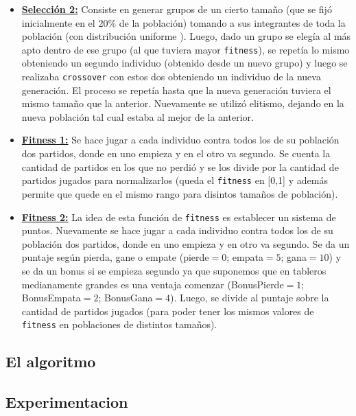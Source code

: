 \documentclass[A4paper,oneside,fleqn,11pt]{article}
\theoremstyle{definition}
\begin{document}
\begin{itemize}
\item \textbf{\underline{Selección 2:}} Consiste en generar grupos de un cierto tamaño (que se fijó inicialmente en el 20\% de la población) tomando a sus integrantes de toda la población (con distribución uniforme%
). Luego, dado un grupo se elegía al más apto dentro de ese grupo (al que tuviera mayor \texttt{fitness}), se repetía lo mismo obteniendo un segundo individuo (obtenido desde un nuevo grupo) y luego se realizaba \texttt{crossover} con estos dos obteniendo un individuo de la nueva generación. El proceso se repetía hasta que la nueva generación tuviera el mismo tamaño que la anterior. Nuevamente se utilizó elitismo, dejando en la nueva población tal cual estaba al mejor de la anterior.

\item \textbf{\underline{Fitness 1:}} Se hace jugar a cada individuo contra todos los de su población dos partidos, donde en uno empieza y en el otro va segundo. Se cuenta la cantidad de partidos en los que no perdió y se los divide por la cantidad de partidos jugados para normalizarlos (queda el \texttt{fitness} en [0,1] y además permite que quede en el mismo rango para disintos tamaños de población).


\item \textbf{\underline{Fitness 2:}} La idea de esta función de \texttt{fitness} es establecer un sistema de puntos. Nuevamente se hace jugar a cada individuo contra todos los de su población dos partidos, donde en uno empieza y en otro va segundo. Se da un puntaje según pierda, gane o empate (pierde$=0$; empata$=5$; gana$=10$) y se da un bonus si se empieza segundo ya que suponemos que en tableros medianamente grandes es una ventaja comenzar (BonusPierde$=1$; BonusEmpata$=2$; BonusGana$=4$). Luego, se divide al puntaje sobre la cantidad de partidos jugados (para poder tener los mismos valores de \texttt{fitness} en poblaciones de distintos tamaños).
\end{itemize}


\subsection{El algoritmo}



\subsection{Experimentacion}
\end{document}
